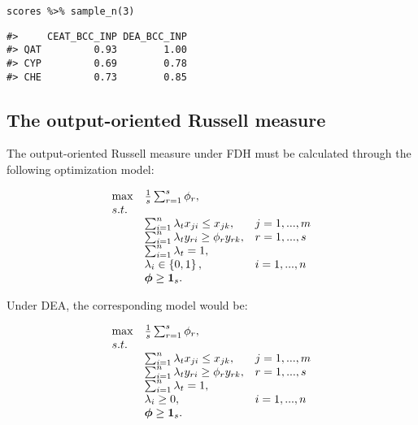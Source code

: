 \begin{verbatim}
scores %>% sample_n(3)
\end{verbatim}

\begin{verbatim}
#>     CEAT_BCC_INP DEA_BCC_INP
#> QAT         0.93        1.00
#> CYP         0.69        0.78
#> CHE         0.73        0.85
\end{verbatim}

\hypertarget{the-output-oriented-russell-measure}{%
\subsection{The output-oriented Russell measure}\label{the-output-oriented-russell-measure}}

The output-oriented Russell measure under FDH must be calculated through the following optimization model:

\begin{equation} \label{(19)} 
\begin{array}{lllll} 
{} & {\max } & {\frac{1}{s} \sum_{r=1}^{s}\phi_{r},} & {} & {} \\ 
{} & {s.t.} & {} & {} & {} \\ 
{} & {} & {\sum_{i=1}^{n}\lambda_{t} x_{ji}  \le x_{jk} ,} & {j=1,...,m} & {} \\ 
{} & {} & {\sum_{i=1}^{n}\lambda_{t} y_{ri}  \ge \phi_{r} y_{rk} ,} & {r=1,...,s} & {} \\ 
{} & {} & {\sum_{i=1}^{n}\lambda_{t}=1,} & {} & {} \\ 
{} & {} & {\lambda_{i} \in \left\{0,1\right\},} & {i=1,...,n} & {} \\ 
{} & {} & {{\it \boldsymbol{\phi}}\ge {\bf 1}_{s}.} 
\end{array}
\end{equation}

Under DEA, the corresponding model would be:

\begin{equation} \label{(20)} 
\begin{array}{lllll} 
{} & {\max } & {\frac{1}{s} \sum_{r=1}^{s}\phi_{r},} & {} & {} \\ 
{} & {s.t.} & {} & {} & {} \\ 
{} & {} & {\sum_{i=1}^{n}\lambda_{t} x_{ji} \le x_{jk} ,} & {j=1,...,m} & {} \\ 
{} & {} & {\sum_{i=1}^{n}\lambda_{t} y_{ri} \ge \phi_{r} y_{rk} ,} & {r=1,...,s} & {} \\ 
{} & {} & {\sum_{i=1}^{n}\lambda_{t}=1,} & {} & {} \\ 
{} & {} & {\lambda_{i} \ge 0,} & {i=1,...,n} & {} \\ 
{} & {} & {{\it \boldsymbol{\phi}}\ge {\bf 1}_{s}.} 
\end{array}
\end{equation}

